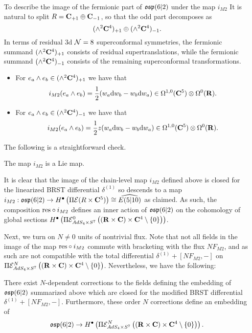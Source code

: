 \documentclass[../main.tex]{subfiles}
\begin{document}
To describe the image of the fermionic part of $\mathfrak{osp}(6|2)$ under the map $i_{M2}$ It is natural to split $R = \mathbf{C}_{+1} \oplus \mathbf{C}_{-1}$, so that the odd part decomposes as
\[
(\wedge^2 \mathbf{C}^4)_{+1} \oplus (\wedge^2 \mathbf{C}^4)_{-1} .
\]
In terms of residual 3d $\mathcal{N}=8$ superconformal symmetries, the fermionic summand $(\wedge^2 \mathbf{C}^4)_{+1}$ consists of residual supertranslations, while the fermionic summand $(\wedge^2 \mathbf{C}^4)_{-1}$ consists of the remaining superconformal transformations. 

\begin{itemize}
\item 
For $e_a\wedge e_b\in (\wedge^2 \mathbf{C}^4)_{+1}$ we have that 
\[
i_{M2} (e_a\wedge e_b) = \frac{1}{2} (w_a \mathrm{d} w_b - w_b \mathrm{d} w_a) \in \Omega^{1,0}(\mathbf{C}^5) \otimes \Omega^0(\mathbf{R}) .
\] 
\item For $e_a\wedge e_b\in (\wedge^2 \mathbf{C}^4)_{-1}$ we have that 
\[
i_{M2} (e_a\wedge e_b) = \frac{1}{2} z (w_a \mathrm{d} w_b - w_b \mathrm{d} w_a) \in \Omega^{1,0}(\mathbf{C}^5) \otimes \Omega^0(\mathbf{R}). 
\] 
\end{itemize}

The following is a straightforward check.

\begin{lem}\label{lem:m2emb}
The map $i_{M2}$ is a Lie map.
\end{lem} 

It is clear that the image of the chain-level map $i_{M2}$ defined above is closed for the linearized BRST differential $\delta^{(1)}$ so descends to a map $i_{M2}: \mathfrak{osp}(6|2) \to H^\bullet \left ( \Pi \mathcal{E} (R\times \mathbf{C}^5)\right )\cong\widehat{E(5|10) }$ as claimed. As such, the composition $\mathrm{res}\circ i_{M2}$ defines an inner action of $\mathfrak{osp}(6|2)$ on the cohomology of global sections $H^\bullet \left ( \Pi \mathcal{E}^0_{AdS_4\times S^7} \left ( (\mathbf{R}\times \mathbf{C}) \times \mathbf{C}^4\setminus \{0\} \right ) \right )$. 

\parsec[]

Next, we turn on $N \ne 0$ units of nontrivial flux. Note that not all fields in the image of the map $\mathrm{res}\circ i_{M2}$ commute with bracketing with the flux $N F_{M2}$, and as such are not compatible with the total differential $\delta^{(1)} + [N F_{M2}, -]$ on $\Pi \mathcal{E}^N_{AdS_4\times S^7} \left ( (\mathbf{R}\times \mathbf{C}) \times \mathbf{C}^4\setminus \{0\} \right )$. Nevertheless, we have the following:

\begin{prop}
\label{prop:brads4}
There exist $N$-dependent corrections to the fields defining the embedding of $\mathfrak{osp}(6|2)$ summarized above which are closed for the modified BRST differential $\delta^{(1)} + [N F_{M2},-]$. 
Furthermore, these order $N$ corrections define an embedding of 
\[\mathfrak{osp}(6|2) \to H^\bullet \left ( \Pi \mathcal{E}^N_{AdS_4\times S^7} \left ( (\mathbf{R}\times \mathbf{C}) \times \mathbf{C}^4\setminus \{0\} \right ) \right ) .\]
\end{prop}
\end{document}
